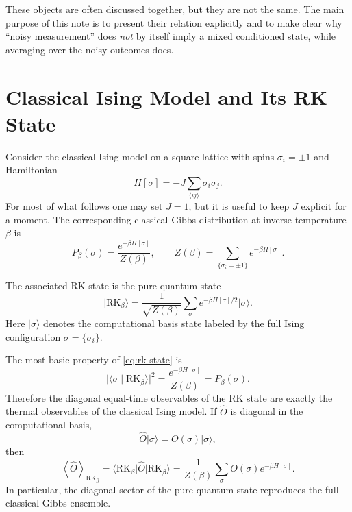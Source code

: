\documentclass[11pt]{article}
\newcommand{\ket}[1]{\lvert #1\rangle}
\newcommand{\bra}[1]{\langle #1\rvert}
\newcommand{\braket}[2]{\langle #1 \mid #2\rangle}
\newcommand{\avg}[1]{\left\langle #1 \right\rangle}
\begin{document}
These objects are often discussed together, but they are not the same. The main purpose of this note is to present their relation explicitly and to make clear why ``noisy measurement'' does \emph{not} by itself imply a mixed conditioned state, while averaging over the noisy outcomes does.

\section{Classical Ising Model and Its RK State}

Consider the classical Ising model on a square lattice with spins $\sigma_i=\pm1$ and Hamiltonian
\begin{equation}
H[\sigma] = - J \sum_{\langle ij\rangle} \sigma_i \sigma_j.
\label{eq:ising-hamiltonian}
\end{equation}
For most of what follows one may set $J=1$, but it is useful to keep $J$ explicit for a moment. The corresponding classical Gibbs distribution at inverse temperature $\beta$ is
\begin{equation}
P_\beta(\sigma)=\frac{e^{-\beta H[\sigma]}}{Z(\beta)},
\qquad
Z(\beta)=\sum_{\{\sigma_i=\pm1\}} e^{-\beta H[\sigma]}.
\label{eq:classical-gibbs}
\end{equation}

The associated RK state is the pure quantum state
\begin{equation}
\ket{\mathrm{RK}_\beta}
=
\frac{1}{\sqrt{Z(\beta)}}\sum_{\sigma}
e^{-\beta H[\sigma]/2}\ket{\sigma}.
\label{eq:rk-state}
\end{equation}
Here $\ket{\sigma}$ denotes the computational basis state labeled by the full Ising configuration $\sigma=\{\sigma_i\}$.

The most basic property of \eqref{eq:rk-state} is
\begin{equation}
\bigl|\braket{\sigma}{\mathrm{RK}_\beta}\bigr|^2
=
\frac{e^{-\beta H[\sigma]}}{Z(\beta)}
=P_\beta(\sigma).
\label{eq:rk-born}
\end{equation}
Therefore the diagonal equal-time observables of the RK state are exactly the thermal observables of the classical Ising model. If $\hat O$ is diagonal in the computational basis,
\begin{equation}
\hat O \ket{\sigma}= O(\sigma)\ket{\sigma},
\end{equation}
then
\begin{equation}
\avg{\hat O}_{\mathrm{RK}_\beta}
=
\bra{\mathrm{RK}_\beta}\hat O\ket{\mathrm{RK}_\beta}
=
\frac{1}{Z(\beta)}\sum_\sigma O(\sigma)e^{-\beta H[\sigma]}.
\label{eq:diagonal-thermal}
\end{equation}
In particular, the diagonal sector of the pure quantum state reproduces the full classical Gibbs ensemble.
\end{document}
